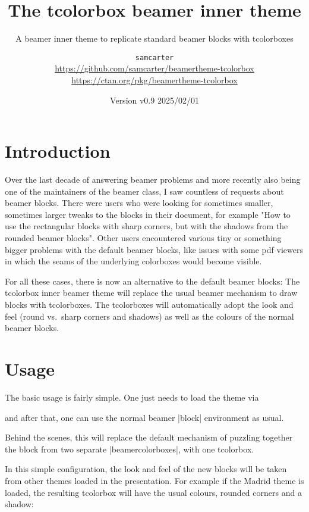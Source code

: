 \documentclass{scrartcl}
\title{The tcolorbox beamer inner theme}
\subtitle{A beamer inner theme to replicate standard beamer blocks with tcolorboxes}
\author{%
  \texorpdfstring{
    \texttt{samcarter}\\
    \url{https://github.com/samcarter/beamertheme-tcolorbox}\\
    \url{https://ctan.org/pkg/beamertheme-tcolorbox}
  }{samcarter}}
\date{Version v0.9 \textendash{} 2025/02/01}
\begin{document}
\maketitle

\section{Introduction}
\label{intro}

Over the last decade of answering beamer problems and more recently also being one of the maintainers of the beamer class, I saw countless of requests about beamer blocks. There were users who were looking for sometimes smaller, sometimes larger tweaks to the blocks in their document, for example "How to use the rectangular blocks with sharp corners, but with the shadows from the rounded beamer blocks". Other users encountered various tiny or something bigger problems with the default beamer blocks, like issues with some pdf viewers in which the seams of the underlying colorboxes would become visible.

For all these cases, there is now an alternative to the default beamer blocks: The tcolorbox inner beamer theme will replace the usual beamer mechanism to draw blocks with tcolorboxes. The tcolorboxes will automatically adopt the look and feel (round vs.\ sharp corners and shadows) as well as the colours of the normal beamer blocks.

\blurb

\section{Usage}

The basic usage is fairly simple. One just needs to load the theme via
\begin{tcolorbox}[lower separated=false,title={Usage}]
\begin{samcode}
\end{samcode}
\end{tcolorbox}
and after that, one can use the normal beamer \saminline|block| environment as usual.

Behind the scenes, this will replace the default mechanism of puzzling together the block from two separate \saminline|beamercolorboxes|, with one tcolorbox.

In this simple configuration, the look and feel of the new blocks will be taken from other themes loaded in the presentation. For example if the Madrid theme is loaded, the resulting tcolorbox will have the usual colours, rounded corners and a shadow:
\end{document}
